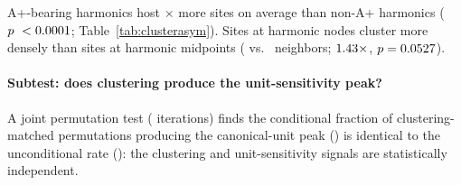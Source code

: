 \begin{table}[!t]
\centering
\caption{Cluster asymmetry: A+ vs.\ non-A+ sites in the full UNESCO corpus
  ($N = \NclusterTotal$; cluster radius $\pm \clusterRadiusDeg$\textdegree{} lon)}
\label{tab:clusterasym}
\small
{}%
\end{table}

\noindent A+-bearing harmonics host \clusterHarmonicRatio$\times$ more sites
on average than non-A+ harmonics ($p\ < 0.0001$;
Table~\ref{tab:clusterasym}).
Sites at harmonic nodes cluster more densely than sites at harmonic midpoints
(\clusterNodeApMean{} vs.\ \clusterAntiApMean{} neighbors;
$1.43\times$, $p = 0.0527$).

\paragraph*{Subtest: does clustering produce the unit-sensitivity peak?}
\label{sec:cluster_cond_sensitivity}
A joint permutation test (\clusterCondN{} iterations) finds the conditional
fraction of clustering-matched permutations producing the canonical-unit peak
(\clusterCondPeakFrac{}) is identical to the unconditional rate
(\clusterCondPeakFracUncond{}): the clustering and unit-sensitivity signals
are statistically independent.

